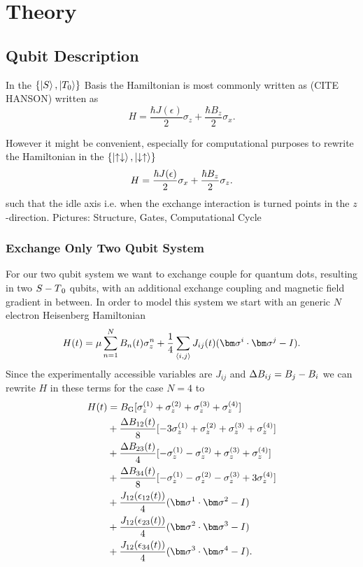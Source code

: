 \chapter{Theory}
\section{Qubit Description}
In the $\{ \ket{S},\ket{T_0} \}$ Basis the Hamiltonian is most commonly written as (CITE HANSON) written as
\begin{equation}
    H=\frac{\hbar J(\epsilon)}{2}\sigma_z + \frac{\hbar B_z}{2} \sigma_x.
\end{equation}

However it might be convenient, especially for computational purposes to rewrite the Hamiltonian in the $\{\ket{\uparrow \downarrow},\ket{\downarrow \uparrow} \}$ 
\begin{equation}
    H=\frac{\hbar J(\epsilon)}{2}\sigma_x + \frac{\hbar B_z}{2} \sigma_z.
\end{equation}
such that the idle axis i.e. when the exchange interaction is turned points in the $z$-direction.
Pictures: Structure, Gates, Computational Cycle
\subsection{Exchange Only Two Qubit System}
For our two qubit system we want to exchange couple for quantum dots, resulting in two $S-T\textsubscript{0}$ qubits, with an additional exchange coupling and magnetic field gradient in between. In order to model this system we start with an generic $N$ electron Heisenberg Hamiltonian
\begin{equation}
    H(t)=\mu \sum_{n=1}^N B_n(t) \pz^n + \frac{1}{4} \sum_{\langle i,j \rangle} J_{ij}(t)(\vecsig ^i \cdot \vecsig ^j - \eye).
\end{equation}
Since the experimentally accessible variables are $J_{ij}$ and $\mathrm{\Delta}B_{ij}=B_j-B_i$ we can rewrite $H$ in these terms for the case $N=4$ to
\begin{align}
    H(t)  &=  B_\mr{G}             [\pz^{(1)} + \pz^{(2)} + \pz^{(3)} + \pz^{(4)} ]  \nonumber\\
          &+ \frac{\db_{12}(t)}{8} [-3\pz^{(1)} + \pz^{(2)} + \pz^{(3)} + \pz^{(4)} ]\nonumber \\
          &+ \frac{\db_{23}(t)}{4} [-\pz^{(1)} - \pz^{(2)} + \pz^{(3)} + \pz^{(4)} ] \nonumber\\
          &+\frac{\db_{34}(t)}{8}  [-\pz^{(1)} - \pz^{(2)} - \pz^{(3)} +3 \pz^{(4)} ] \\
          &+\frac{J_{12}(\epsilon_{12}(t))}{4} (\vecsig ^1 \cdot \vecsig ^2 - \eye) \nonumber\\
          &+\frac{J_{12}(\epsilon_{23}(t))}{4} (\vecsig ^2 \cdot \vecsig ^3 - \eye) \nonumber\\
          &+\frac{J_{12}(\epsilon_{34}(t))}{4} (\vecsig ^3 \cdot \vecsig ^4 - \eye). \nonumber
\end{align}

